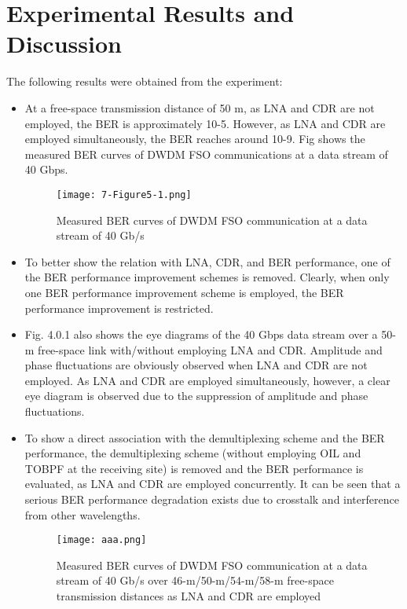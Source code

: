 \documentclass[hidelinks, 12pt]{report}
\begin{document}
\chapter{Experimental Results and Discussion}
The following results were obtained from the experiment:
\begin{itemize}
    \item At a free-space transmission distance of 50 m, as LNA and CDR are
not employed, the BER is approximately 10-5. However, as LNA and CDR are employed simultaneously,
the BER reaches around  10-9.
Fig  shows the measured BER curves of DWDM FSO communications at a data stream of 40 Gbps.
\begin{figure}[H]
\centering
\texttt{[image: 7-Figure5-1.png]}
\caption[Measured BER curves of DWDM FSO communication at a data stream of 40 Gb/s ]{Measured BER curves of DWDM FSO communication at a data stream of 40 Gb/s }
\label{Measured BER curves of DWDM FSO communication at a data stream of 40 Gb/s }
\end{figure}
\item To better show the relation with LNA, CDR, and
BER performance, one of the BER performance improvement schemes is removed. Clearly,
when only one BER performance improvement scheme is employed, the BER performance improvement
is restricted. 
\item Fig. 4.0.1 also shows the eye diagrams
of the 40 Gbps data stream  over a 50-m free-space link with/without employing LNA
and CDR. Amplitude and phase fluctuations are obviously observed when LNA and CDR are
not employed. As LNA and CDR are employed simultaneously, however, a clear eye diagram is
observed due to the suppression of amplitude and phase fluctuations.
\item To show a direct association
with the demultiplexing scheme and the BER performance, the demultiplexing
scheme (without employing OIL and TOBPF at the receiving site) is removed and  the BER performance is evaluated,
as LNA and CDR are employed concurrently. It can be seen that a serious BER performance degradation exists due to crosstalk and interference from other wavelengths.
\begin{figure}[H]
\centering
\texttt{[image: aaa.png]}
\caption[Measured BER curves of DWDM FSO communication at a data stream of 40 Gb/s  over
46-m/50-m/54-m/58-m free-space transmission distances as LNA and CDR are employed
concurrently. ]{Measured BER curves of DWDM FSO communication at a data stream of 40 Gb/s  over
46-m/50-m/54-m/58-m free-space transmission distances as LNA and CDR are employed
}
\end{figure}
\end{itemize}
\end{document}
